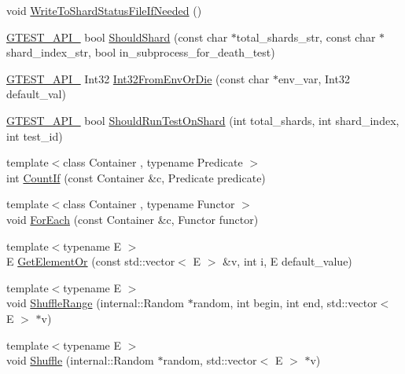 \begin{DoxyCompactItemize}
void \hyperlink{namespacetesting_1_1internal_a656c8ec8f2ee82fa90b9ba61b6145538}{\-Write\-To\-Shard\-Status\-File\-If\-Needed} ()
\item 
\hyperlink{gtest-port_8h_aa73be6f0ba4a7456180a94904ce17790}{\-G\-T\-E\-S\-T\-\_\-\-A\-P\-I\-\_\-} bool \hyperlink{namespacetesting_1_1internal_a57e2697262a419061fc4cd3377a9271e}{\-Should\-Shard} (const char $\ast$total\-\_\-shards\-\_\-str, const char $\ast$shard\-\_\-index\-\_\-str, bool in\-\_\-subprocess\-\_\-for\-\_\-death\-\_\-test)
\item 
\hyperlink{gtest-port_8h_aa73be6f0ba4a7456180a94904ce17790}{\-G\-T\-E\-S\-T\-\_\-\-A\-P\-I\-\_\-} \-Int32 \hyperlink{namespacetesting_1_1internal_afec7cf2eb159fa969f88d192ee507d23}{\-Int32\-From\-Env\-Or\-Die} (const char $\ast$env\-\_\-var, \-Int32 default\-\_\-val)
\item 
\hyperlink{gtest-port_8h_aa73be6f0ba4a7456180a94904ce17790}{\-G\-T\-E\-S\-T\-\_\-\-A\-P\-I\-\_\-} bool \hyperlink{namespacetesting_1_1internal_ac05861de55e638fa73ea70a3f2f6f622}{\-Should\-Run\-Test\-On\-Shard} (int total\-\_\-shards, int shard\-\_\-index, int test\-\_\-id)
\item 
{\footnotesize template$<$class Container , typename Predicate $>$ }\\int \hyperlink{namespacetesting_1_1internal_ab37ae76c997078f65ba28f35b3657151}{\-Count\-If} (const \-Container \&c, \-Predicate predicate)
\item 
{\footnotesize template$<$class Container , typename Functor $>$ }\\void \hyperlink{namespacetesting_1_1internal_af699259a2b1e5e06250ed075b735b1f6}{\-For\-Each} (const \-Container \&c, \-Functor functor)
\item 
{\footnotesize template$<$typename E $>$ }\\\-E \hyperlink{namespacetesting_1_1internal_a06b7c21a279eef9fbf0b8810af41e6b5}{\-Get\-Element\-Or} (const std\-::vector$<$ \-E $>$ \&v, int i, \-E default\-\_\-value)
\item 
{\footnotesize template$<$typename E $>$ }\\void \hyperlink{namespacetesting_1_1internal_af0e4357002b5772a92cb960ea611e80c}{\-Shuffle\-Range} (internal\-::\-Random $\ast$random, int begin, int end, std\-::vector$<$ \-E $>$ $\ast$v)
\item 
{\footnotesize template$<$typename E $>$ }\\void \hyperlink{namespacetesting_1_1internal_a955e3f72f36c9db3a1165517010f52a3}{\-Shuffle} (internal\-::\-Random $\ast$random, std\-::vector$<$ \-E $>$ $\ast$v)

\end{DoxyCompactItemize}
